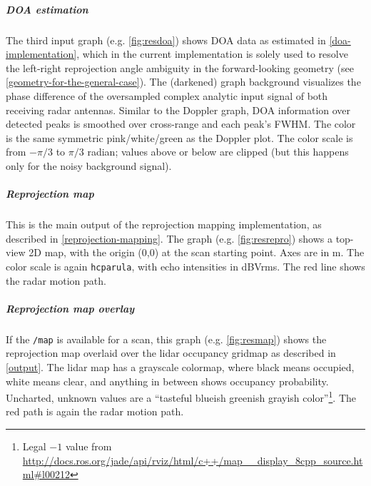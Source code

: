 \subparagraph{DOA estimation}
The third input graph (e.g. \cref{fig:resdoa}) shows DOA data as estimated in \cref{doa-implementation}, which in the current implementation is solely used to resolve the left-right reprojection angle ambiguity in the forward-looking geometry (see \cref{geometry-for-the-general-case}). The (darkened) graph background visualizes the phase difference of the oversampled complex analytic input signal of both receiving radar antennas. Similar to the Doppler graph, DOA information over detected peaks is smoothed over cross-range and each peak's FWHM. The color is the same symmetric pink/white/green as the Doppler plot. The color scale is from $-\pi/3$ to $\pi/3$ radian; values above or below are clipped (but this happens only for the noisy background signal).

\subparagraph{Reprojection map}
This is the main output of the reprojection mapping implementation, as described in \cref{reprojection-mapping}. The graph (e.g. \cref{fig:resrepro}) shows a top-view 2D map, with the origin (0,0) at the scan starting point. Axes are in \si{m}. The color scale is again \texttt{hcparula}, with echo intensities in \si{dBVrms}. The red line shows the radar motion path.

\subparagraph{Reprojection map overlay}
If the \texttt{/map} is available for a scan, this graph (e.g. \cref{fig:resmap}) shows the reprojection map overlaid over the lidar occupancy gridmap as described in \cref{output}. The lidar map has a grayscale colormap, where black means occupied, white means clear, and anything in between shows occupancy probability. Uncharted, unknown values are a ``tasteful blueish greenish grayish color''\footnote{Legal $-1$ value from \url{http://docs.ros.org/jade/api/rviz/html/c++/map\_\_display\_8cpp\_source.html\#l00212}}. The red path is again the radar motion path.


